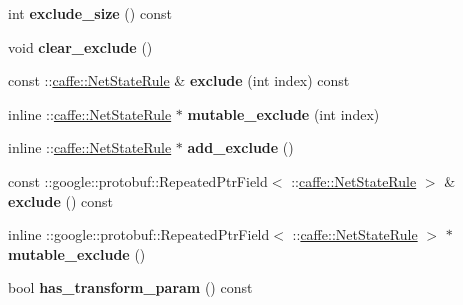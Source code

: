 \begin{DoxyCompactItemize}
\item 
\mbox{\label{classcaffe_1_1_layer_parameter_a844d3237d0f9373ef712f6fc131054ac}} 
int {\bfseries exclude\+\_\+size} () const
\item 
\mbox{\label{classcaffe_1_1_layer_parameter_a5ba31fdad541c159bffcb1bdd427c120}} 
void {\bfseries clear\+\_\+exclude} ()
\item 
\mbox{\label{classcaffe_1_1_layer_parameter_ab4fd71a7414642ac60ba0b179cb97943}} 
const \+::\mbox{\hyperlink{classcaffe_1_1_net_state_rule}{caffe\+::\+Net\+State\+Rule}} \& {\bfseries exclude} (int index) const
\item 
\mbox{\label{classcaffe_1_1_layer_parameter_acb9fb55e3c34d8de3c221bd18e94c2bf}} 
inline \+::\mbox{\hyperlink{classcaffe_1_1_net_state_rule}{caffe\+::\+Net\+State\+Rule}} $\ast$ {\bfseries mutable\+\_\+exclude} (int index)
\item 
\mbox{\label{classcaffe_1_1_layer_parameter_a9faac2847c01657523b10269e5c80993}} 
inline \+::\mbox{\hyperlink{classcaffe_1_1_net_state_rule}{caffe\+::\+Net\+State\+Rule}} $\ast$ {\bfseries add\+\_\+exclude} ()
\item 
\mbox{\label{classcaffe_1_1_layer_parameter_a2414da3290d339226dfacbf603650ec4}} 
const \+::google\+::protobuf\+::\+Repeated\+Ptr\+Field$<$ \+::\mbox{\hyperlink{classcaffe_1_1_net_state_rule}{caffe\+::\+Net\+State\+Rule}} $>$ \& {\bfseries exclude} () const
\item 
\mbox{\label{classcaffe_1_1_layer_parameter_ac5e37d1dbaeba23ef972a3f2bfbaf660}} 
inline \+::google\+::protobuf\+::\+Repeated\+Ptr\+Field$<$ \+::\mbox{\hyperlink{classcaffe_1_1_net_state_rule}{caffe\+::\+Net\+State\+Rule}} $>$ $\ast$ {\bfseries mutable\+\_\+exclude} ()
\item 
\mbox{\label{classcaffe_1_1_layer_parameter_af9c26d652e4c8d7574ca29e4f8a40ff0}} 
bool {\bfseries has\+\_\+transform\+\_\+param} () const
\item 
\mbox{\label{classcaffe_1_1_layer_parameter_a4d6d3b5066a0b263bc7675367b3c63dd}} 

\end{DoxyCompactItemize}
